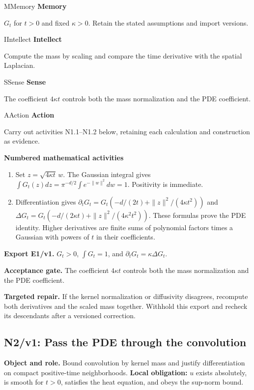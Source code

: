 \documentclass[preprint,12pt,aps,pra,showkeys,amsmath,amssymb,superscriptaddress,floatfix]{revtex4-2}
\theoremstyle{definition}
\theoremstyle{remark}
\newcommand{\mmfaculty}[3]{%
 \begin{mmfacultybox}{#1}{#2}
 {\sffamily\bfseries\color{MMBlue}#2}\par\smallskip #3
 \end{mmfacultybox}}
\newcommand{\field}[2]{\par\smallskip\noindent\textbf{#1.} #2\par}
\begin{document}
\mmfaculty{M}{Memory}{\(G_t\) for \(t>0\) and fixed \(\kappa>0\). Retain the stated
assumptions and import versions.}

\mmfaculty{I}{Intellect}{Compute the mass by scaling and compare the time derivative with the
spatial Laplacian.}

\mmfaculty{S}{Sense}{The coefficient \(4\kappa t\) controls both the mass normalization and
the PDE coefficient.}

\mmfaculty{A}{Action}{Carry out activities N1.1--N1.2 below, retaining each calculation and
construction as evidence.}

\smallskip\noindent\textbf{Numbered mathematical activities}

\begin{enumerate}[label=N1.\arabic*,leftmargin=3.4em]

\item Set \(z=\sqrt{4\kappa t}\,w\). The Gaussian integral gives
\(\int G_t(z)dz=\pi^{-d/2}\int e^{-\|w\|^2}dw=1\). Positivity is
immediate.

\item Differentiation gives
\(\partial_tG_t=G_t(-d/(2t)+\|z\|^2/(4\kappa t^2))\) and
\(\Delta G_t=G_t(-d/(2\kappa t)+\|z\|^2/(4\kappa^2t^2))\). These
formulas prove the PDE identity. Higher derivatives are finite sums of
polynomial factors times a Gaussian with powers of \(t\) in their
coefficients.

\end{enumerate}

\field{Export E1/v1}{\(G_t>0\), \(\int G_t=1\), and \(\partial_tG_t=\kappa\Delta G_t\).}

\field{Acceptance gate}{The coefficient \(4\kappa t\) controls both the mass normalization and
the PDE coefficient.}

\field{Targeted repair}{If the kernel normalization or diffusivity disagrees, recompute both
derivatives and the scaled mass together. Withhold this export and
recheck its descendants after a versioned correction.}

\clearpage

\subsection{N2/v1: Pass the PDE through the convolution}

\field{Object and role}{Bound convolution by kernel mass and justify differentiation on compact
positive-time neighborhoods. \textbf{Local obligation:} \(u\) exists
absolutely, is smooth for \(t>0\), satisfies the heat equation, and
obeys the sup-norm bound.}
\end{document}
